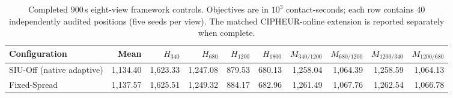 \begin{table}[t]
\centering
\scriptsize
\setlength{\tabcolsep}{2.5pt}
\caption{Completed 900\,s eight-view framework controls. Objectives are in $10^3$ contact-seconds; each row contains 40 independently audited positions (five seeds per view). The matched CIPHEUR-online extension is reported separately when complete.}
\label{tab:core-controls-full}
\begin{tabular}{@{}lrrrrrrrrr@{}}
\toprule
Configuration & Mean & $H_{340}$ & $H_{680}$ & $H_{1200}$ & $H_{1800}$ & $M_{340/1200}$ & $M_{680/1200}$ & $M_{1200/340}$ & $M_{1200/680}$ \\
\midrule
SIU-Off (native adaptive) & 1,134.40 & 1,623.33 & 1,247.08 & 879.53 & 680.13 & 1,258.04 & 1,064.39 & 1,258.59 & 1,064.13 \\
Fixed-Spread & 1,137.57 & 1,625.51 & 1,249.32 & 884.17 & 682.96 & 1,261.49 & 1,067.76 & 1,262.54 & 1,066.78 \\
\bottomrule
\end{tabular}
\end{table}
